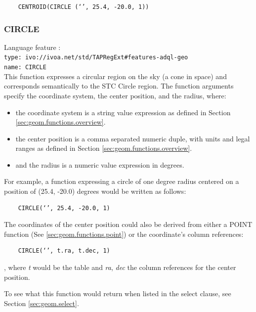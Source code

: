 \documentclass[11pt,a4paper]{ivoa}
\begin{document}
\begin{verbatim}
    CENTROID(CIRCLE (‘’, 25.4, -20.0, 1))
\end{verbatim}

\subsubsection{CIRCLE}
\label{sec:geom.functions.circle}
{\footnotesize Language feature :}\\
{\footnotesize \verb|type: ivo://ivoa.net/std/TAPRegExt#features-adql-geo|}\\
{\footnotesize \verb|name: CIRCLE|}\\

This function expresses a circular region on the sky (a cone in space) and
corresponds semantically to the STC Circle region. The
function arguments specify the coordinate system, the center position,
and the radius, where:

\begin{itemize}
    \item the coordinate system is a string value expression as defined in Section \ref{sec:geom.functions.overview}.
    \item the center position is a comma separated numeric duple, with units and legal ranges as defined in Section \ref{sec:geom.functions.overview}.
    \item and the radius is a numeric value expression in degrees.
\end{itemize}

For example, a function expressing a circle of one degree radius centered on a
position of (25.4, -20.0) degrees would be written as follows:

\begin{verbatim}
    CIRCLE(‘’, 25.4, -20.0, 1)
\end{verbatim}

The coordinates of the center position could also be derived from either a
POINT function (See \ref{sec:geom.functions.point}) or the coordinate’s column references:

\begin{verbatim}
    CIRCLE(‘’, t.ra, t.dec, 1)
\end{verbatim}

, where \textit{t} would be the table and \textit{ra}, \textit{dec} the
column references for the center position.

To see what this function would return when listed in the select clause, see
Section \ref{sec:geom.select}.
\end{document}
